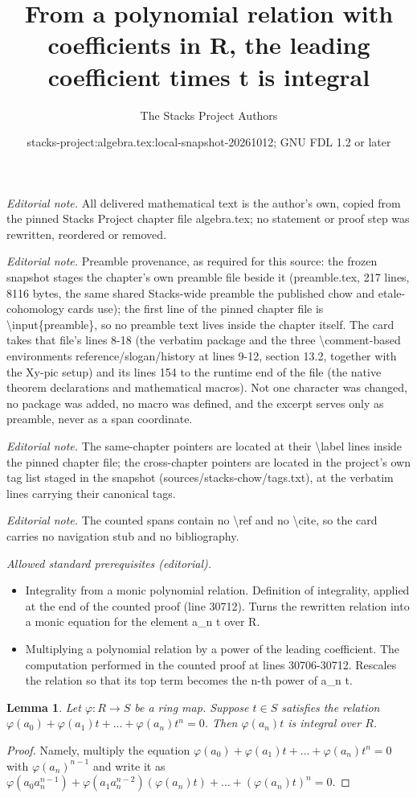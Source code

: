 \documentclass[10pt,a4paper]{amsart}
\title{From a polynomial relation with coefficients in R, the leading coefficient times t is integral}
\author{The Stacks Project Authors}
\date{stacks-project:algebra.tex:local-snapshot-20261012; GNU FDL 1.2 or later}
\theoremstyle{plain}
\newtheorem{lemma}[subsection]{Lemma}
\theoremstyle{definition}
\theoremstyle{remark}
\numberwithin{equation}{subsection}
\begin{document}
\maketitle
\noindent\textit{Editorial note.} All delivered mathematical text is the author's own, copied from the pinned Stacks Project chapter file algebra.tex; no statement or proof step was rewritten, reordered or removed.\par\medskip
\noindent\textit{Editorial note.} Preamble provenance, as required for this source: the frozen snapshot stages the chapter's own preamble file beside it (preamble.tex, 217 lines, 8116 bytes, the same shared Stacks-wide preamble the published chow and etale-cohomology cards use); the first line of the pinned chapter file is \textbackslash{}input\{preamble\}, so no preamble text lives inside the chapter itself. The card takes that file's lines 8-18 (the verbatim package and the three \textbackslash{}comment-based environments reference/slogan/history at lines 9-12, section 13.2, together with the Xy-pic setup) and its lines 154 to the runtime end of the file (the native theorem declarations and mathematical macros). Not one character was changed, no package was added, no macro was defined, and the excerpt serves only as preamble, never as a span coordinate.\par\medskip
\noindent\textit{Editorial note.} The same-chapter pointers are located at their \textbackslash{}label lines inside the pinned chapter file; the cross-chapter pointers are located in the project's own tag list staged in the snapshot (sources/stacks-chow/tags.txt), at the verbatim lines carrying their canonical tags.\par\medskip
\noindent\textit{Editorial note.} The counted spans contain no \textbackslash{}ref and no \textbackslash{}cite, so the card carries no navigation stub and no bibliography.\par\medskip
\noindent\textit{Allowed standard prerequisites (editorial).}\begin{itemize}
\item Integrality from a monic polynomial relation. Definition of integrality, applied at the end of the counted proof (line 30712). Turns the rewritten relation into a monic equation for the element a\_n t over R.
\item Multiplying a polynomial relation by a power of the leading coefficient. The computation performed in the counted proof at lines 30706-30712. Rescales the relation so that its top term becomes the n-th power of a\_n t.
\end{itemize}\medskip
\begin{lemma}
\label{lemma-make-integral-trivial}
Let $\varphi : R \to S$ be a ring map.
Suppose $t \in S$ satisfies the
relation $\varphi(a_0) + \varphi(a_1)t + \ldots + \varphi(a_n) t^n = 0$.
Then $\varphi(a_n)t$ is integral over $R$.
\end{lemma}

\begin{proof}
Namely, multiply the equation
$\varphi(a_0) + \varphi(a_1)t + \ldots + \varphi(a_n) t^n = 0$
with $\varphi(a_n)^{n-1}$ and write it as
$\varphi(a_0 a_n^{n-1}) +
\varphi(a_1 a_n^{n-2}) (\varphi(a_n)t) +
\ldots +
(\varphi(a_n) t)^n = 0$.
\end{proof}
\end{document}
